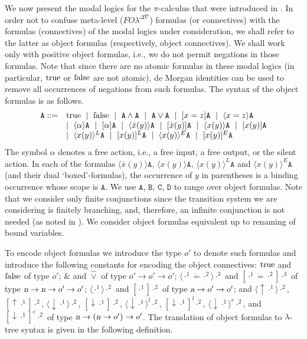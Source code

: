\documentclass{acmtrans2m}
\def \mTrue {\hbox{true}}
\def \mFalse {\hbox{false}}
\def \mAnd {\&}
\def \mOr {\hat \lor}
\newcommand \mBox[1] {[#1]}
\newcommand \mDia[1] {\langle #1 \rangle}
\newcommand \matchBox[3] {[#1 \dot = #2] #3}
\newcommand \matchDia[3] {\langle #1 \dot = #2\rangle #3}
\newcommand \actBox[2] {[#1] #2}
\newcommand \actDia[2] {\langle #1 \rangle #2}
\newcommand \outBox[2] {[\outact\! #1] #2}
\newcommand \outDia[2] {\langle \outact\! #1 \rangle #2}
\newcommand \inBox[2] {[\inact\! #1] #2}
\newcommand \inDia[2] {\langle \inact\! #1 \rangle #2}
\newcommand \inBoxL[2] {[\inact\! #1]^l #2}
\newcommand \inDiaL[2] {\langle \inact\! #1 \rangle^l #2}
\newcommand \inBoxE[2] {[\inact\! #1]^e #2}
\newcommand \inDiaE[2] {\langle \inact\! #1\rangle^e #2}
\def\Api{{\mathtt A}}
\def\Bpi{{\mathtt B}}
\def\Cpi{{\mathtt C}}
\def\Dpi{{\mathtt D}}
\newcommand{\FOL   }{FO\lambda}
\newcommand{\FOLDNb}{\FOL^{\Delta\nabla}}
\newcommand{\action}{\hbox{\sl a}}
\newcommand{\inact}{\mathop{\downarrow}}
\newcommand{\name}{\hbox{\sl n}}
\newcommand{\outact}{\mathop{\uparrow}}
\newcommand{\ra}{\rightarrow}
\begin{document}
We now present the modal logics for the $\pi$-calculus that were introduced
in \cite{milner93tcs}.  
In order not to confuse meta-level ($\FOLDNb$) formulas (or connectives) with
the formulas (connectives) of the modal logics under consideration, we shall
refer to the latter as object formulas (respectively, object connectives). 
We shall work only with positive object formulas, i.e., we do not permit
negations in those formulas. Note that since there are no atomic formulas
in these modal logics (in particular, $\mTrue$ or $\mFalse$ are not atomic),
de Morgan identities can be used to remove all occurrences of
negations from such formulas.
The syntax of the object formulas is as follows. 
$$
\begin{array}{ll}
\Api ::= & \mTrue ~\mid ~ \mFalse ~ \mid ~  \Api \land \Api ~ \mid ~ \Api \lor \Api 
 ~ \mid ~ [x = z] \Api
 ~ \mid ~ \langle x = z \rangle \Api\\
 & \mid ~ \actDia \alpha \Api ~ \mid ~ \actBox \alpha \Api 
 ~ \mid ~ \mDia {\bar x(y)} \Api
 ~ \mid ~ \mBox {\bar x(y)} \Api 
 ~ \mid ~ \mDia {x(y)} \Api ~ \mid ~ \mBox {x(y)} \Api \\
 & \mid ~ \mDia {x(y)}^L \Api ~ \mid ~ \mBox {x(y)}^L \Api
 ~ \mid ~ \mDia {x(y)}^E \Api ~ \mid ~ \mBox {x(y)}^E \Api
\end{array}
$$
The symbol $\alpha$ denotes a free action, i.e., a free input, a free
output, or the silent action.
In each of the formulas 
$\mDia{\bar x(y)}\Api$, $\mDia{x(y)}\Api$, $\mDia{x(y)}^L \Api$ and
$\mDia{x(y)}^E \Api$ (and their dual `boxed'-formulas), the occurrence of $y$ in parentheses is
a binding occurrence whose scope is $\Api$.
We use $\Api$, $\Bpi$, $\Cpi$, $\Dpi$ to range over object formulas.
Note that we consider only finite conjunctions since the transition system
we are considering is finitely branching, and, therefore, an infinite
conjunction is not needed (as noted in \cite{milner93tcs}).
We consider object formulas equivalent up to renaming of bound variables. 

To encode object formulas we introduce the 
type $o'$ to denote such formulas and introduce the
following constants for encoding the object connectives:
$\mTrue$ and $\mFalse$ of type $o'$; 
$\mAnd$ and $\mOr$ of type $o' \ra o' \ra o'$; 
$\matchDia{\cdot^1}{\cdot^2}{\cdot^3}$ and $\matchBox{\cdot^1}{\cdot^2}{\cdot^3}$
of type $\name \ra \name \ra o' \ra o'$; 
$\actDia{\cdot^1}{\cdot^2}$ and $\actBox{\cdot^1}{\cdot^2}$ of type $\action
\ra o' \ra o'$; and
$\outDia{\cdot^1}{\cdot^2}$,
$\outBox{\cdot^1}{\cdot^2}$,
$\inDia{\cdot^1}{\cdot^2}$, 
$\inBox{\cdot^1}{\cdot^2}$, 
$\inDiaL{\cdot^1}{\cdot^2}$, 
$\inBoxL{\cdot^1}{\cdot^2}$, 
$\inDiaE{\cdot^1}{\cdot^2}$, and
$\inBoxE{\cdot^1}{\cdot^2}$ of type $\name\ra(\name\ra o')\ra o'$.
The translation of object formulas to $\lambda$-tree syntax is
given in the following definition.
\end{document}
